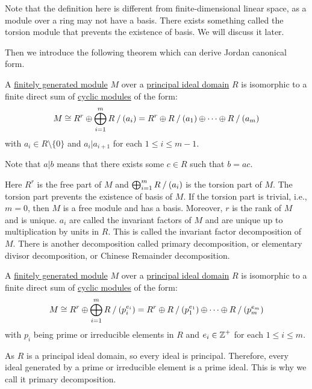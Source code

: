 Note that the definition here is different from finite-dimensional linear space, as a module over a ring may not have a basis. There exists something called the torsion module that prevents the existence of basis. We will discuss it later.

Then we introduce the following theorem which can derive Jordan canonical form.

\begin{theorem}
  A \hyperref[def:finitely_generated_module]{finitely generated module} $M$ over a \hyperref[def:principal_ideal_domain]{principal ideal domain} $R$ is isomorphic to a finite direct sum of \hyperref[def:cyclic_module]{cyclic modules} of the form:
  \[
    M \cong R^r \oplus \bigoplus_{i = 1}^m R \mathbin{/} (a_i) = R^r \oplus R \mathbin{/} (a_1) \oplus \cdots \oplus R \mathbin{/} (a_m)
  \]
  with $a_i \in R \setminus \{ 0 \}$ and $a_i | a_{i + 1}$ for each $1 \leq i \leq m - 1$.
\end{theorem}
\begin{remark}
  Note that $a | b$ means that there exists some $c \in R$ such that $b = ac$.
\end{remark}
Here $R^r$ is the free part of $M$ and $\bigoplus_{i = 1}^m R \mathbin{/} (a_i)$ is the torsion part of $M$. The torsion part prevents the existence of basis of $M$. If the torsion part is trivial, i.e., $m = 0$, then $M$ is a free module and has a basis. Moreover, $r$ is the rank of $M$ and is unique. $a_i$ are called the invariant factors of $M$ and are unique up to multiplication by units in $R$. This is called the invariant factor decomposition of $M$. There is another decomposition called primary decomposition, or elementary divisor decomposition, or Chinese Remainder decomposition.
\begin{theorem}
  A \hyperref[def:finitely_generated_module]{finitely generated module} $M$ over a \hyperref[def:principal_ideal_domain]{principal ideal domain} $R$ is isomorphic to a finite direct sum of \hyperref[def:cyclic_module]{cyclic modules} of the form:
  \[
    M \cong R^r \oplus \bigoplus_{i = 1}^m R \mathbin{/} (p_i^{e_i}) = R^r \oplus R \mathbin{/} (p_1^{e_1}) \oplus \cdots \oplus R \mathbin{/} (p_m^{e_m})
  \]
  with $p_i$ being prime or irreducible elements in $R$ and $e_i \in \operatorname{\mathbb{Z}}^+$ for each $1 \leq i \leq m$.
\end{theorem}
\begin{remark}
  As $R$ is a principal ideal domain, so every ideal is principal. Therefore, every ideal generated by a prime or irreducible element is a prime ideal. This is why we call it primary decomposition.
\end{remark}

